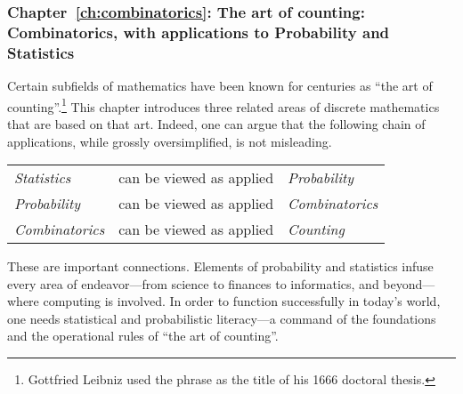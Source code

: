\subsubsection{Chapter~\ref{ch:combinatorics}: 
The art of counting: Combinatorics, with applications to Probability and Statistics}

Certain subfields of mathematics have been known for centuries as ``the art of counting''.\footnote{Gottfried Leibniz used the phrase as the title of his 1666 doctoral thesis.}  This chapter introduces three related areas of discrete mathematics that are based on that art.  Indeed, one can argue that the following chain of applications, while grossly oversimplified, is not misleading.

\smallskip

\begin{tabular}{lcl}
{\it Statistics} & can be viewed as applied & {\it Probability} \\
{\it Probability} & can be viewed as applied & {\it Combinatorics} \\
{\it Combinatorics} & can be viewed as applied & {\it Counting}
\end{tabular}

\smallskip

\noindent
These are important connections.  Elements of probability and statistics infuse every area of endeavor---from science to finances to informatics, and beyond---where computing is involved.  In order to function successfully in today's world, one needs statistical and probabilistic literacy---a command of the foundations and the operational rules of ``the art of counting''.


